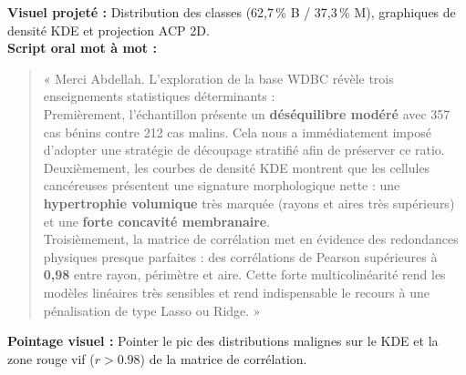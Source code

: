 \documentclass[a4paper,11pt]{article}
\begin{document}
\begin{tcolorbox}[speechbox, title={Slide 4 : Analyse Exploratoire des Données (EDA) (02:15 -- 03:20)}]
	\textbf{Visuel projeté :} Distribution des classes (62,7\,\% B / 37,3\,\% M), graphiques de densité KDE et projection ACP 2D.\\
	\textbf{Script oral mot à mot :}
	\begin{quote}
		« Merci Abdellah. L'exploration de la base WDBC révèle trois enseignements statistiques déterminants :\\
		Premièrement, l'échantillon présente un \textbf{déséquilibre modéré} avec 357 cas bénins contre 212 cas malins. Cela nous a immédiatement imposé d'adopter une stratégie de découpage stratifié afin de préserver ce ratio.\\
		Deuxièmement, les courbes de densité KDE montrent que les cellules cancéreuses présentent une signature morphologique nette : une \textbf{hypertrophie volumique} très marquée (rayons et aires très supérieurs) et une \textbf{forte concavité membranaire}.\\
		Troisièmement, la matrice de corrélation met en évidence des redondances physiques presque parfaites : des corrélations de Pearson supérieures à \textbf{0,98} entre rayon, périmètre et aire. Cette forte multicolinéarité rend les modèles linéaires très sensibles et rend indispensable le recours à une pénalisation de type Lasso ou Ridge. »
	\end{quote}
	\textbf{Pointage visuel :} Pointer le pic des distributions malignes sur le KDE et la zone rouge vif ($r > 0.98$) de la matrice de corrélation.
\end{tcolorbox}
\end{document}
